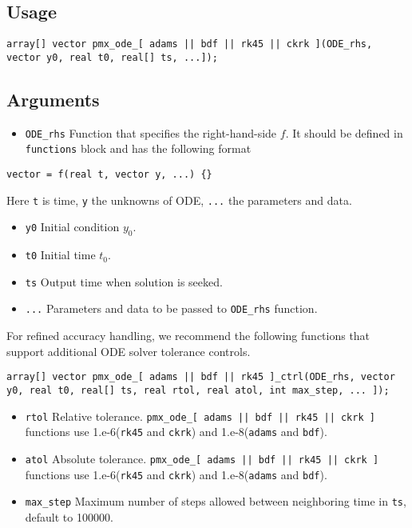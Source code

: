 \documentclass[12pt, reqno, oneside]{amsbook}
\numberwithin{equation}{chapter}
\numberwithin{figure}{chapter}
\numberwithin{table}{chapter}
\theoremstyle{remark}
\begin{document}
\subsection{Usage}
\label{sec:org13cb90b}
\begin{verbatim}
array[] vector pmx_ode_[ adams || bdf || rk45 || ckrk ](ODE_rhs, vector y0, real t0, real[] ts, ...]);
\end{verbatim}
\subsection{Arguments}
\label{sec:orgcf984ad}
\begin{itemize}
\item \texttt{ODE\_rhs}
Function that specifies the right-hand-side \(f\).
It should be defined in
\texttt{functions} block and has the following format
\end{itemize}
\begin{verbatim}
vector = f(real t, vector y, ...) {}
\end{verbatim}
Here \texttt{t} is time, \texttt{y} the unknowns of ODE, \texttt{...} the parameters and data.
\begin{itemize}
\item \texttt{y0}
Initial condition \(y_0\).
\item \texttt{t0}
Initial time \(t_0\).
\item \texttt{ts}
Output time when solution is seeked.
\item \texttt{...}
Parameters and data to be passed to \texttt{ODE\_rhs} function.
\end{itemize}

For refined accuracy handling, we recommend the following functions that support additional ODE solver tolerance controls.
\begin{verbatim}
array[] vector pmx_ode_[ adams || bdf || rk45 ]_ctrl(ODE_rhs, vector y0, real t0, real[] ts, real rtol, real atol, int max_step, ... ]);
\end{verbatim}
\begin{itemize}
\item \texttt{rtol}
Relative tolerance. \texttt{pmx\_ode\_[ adams || bdf || rk45 || ckrk ]} functions use 1.e-6(\texttt{rk45} and \texttt{ckrk}) and 1.e-8(\texttt{adams} and \texttt{bdf}).
\item \texttt{atol}
Absolute tolerance. \texttt{pmx\_ode\_[ adams || bdf || rk45 || ckrk ]} functions use 1.e-6(\texttt{rk45} and \texttt{ckrk}) and 1.e-8(\texttt{adams} and \texttt{bdf}).
\item \texttt{max\_step}
Maximum number of steps allowed between neighboring time in \texttt{ts},
default to 100000.
\end{itemize}
\end{document}
